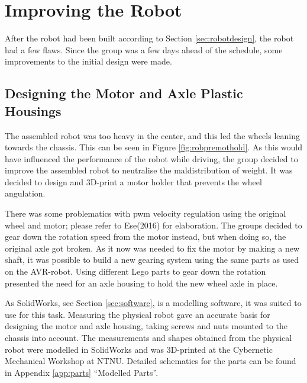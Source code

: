 \section{Improving the Robot}
\label{sec:improvements}
After the robot had been built according to Section \ref{sec:robotdesign}, the robot had a few flaws. Since the group was a few days ahead of the schedule, some improvements to the initial design were made.

\subsection{Designing the Motor and Axle Plastic Housings}
\label{sec:motoraxle}
The assembled robot was too heavy in the center, and this led the wheels leaning towards the chassis. This can be seen in Figure \ref{fig:robpremothold}.  As this would have influenced the performance of the robot while driving, the group decided to improve the assembled robot to neutralise the maldistribution of weight. It was decided to design and 3D-print a motor holder that prevents the wheel angulation.

There was some problematics with \acrshort{pwm} velocity regulation using the original wheel and motor; please refer to Ese(2016) for elaboration. The groups decided to gear down the rotation speed from the motor instead, but when doing so, the original axle got broken. As it now was needed to fix the motor by making a new shaft, it was possible to build a new gearing system using the same parts as used on the AVR-robot. Using different Lego parts to gear down the rotation presented the need for an axle housing to hold the new wheel axle in place.

As SolidWorks, see Section \ref{sec:software}, is a modelling software, it was suited to use for this task. Measuring the physical robot gave an accurate basis for designing the motor and axle housing, taking screws and nuts mounted to the chassis into account. The measurements and shapes obtained from the physical robot were modelled in SolidWorks and was 3D-printed at the Cybernetic Mechanical Workshop at NTNU. Detailed schematics for the parts can be found in Appendix \ref{app:parts} ``Modelled Parts''. 


